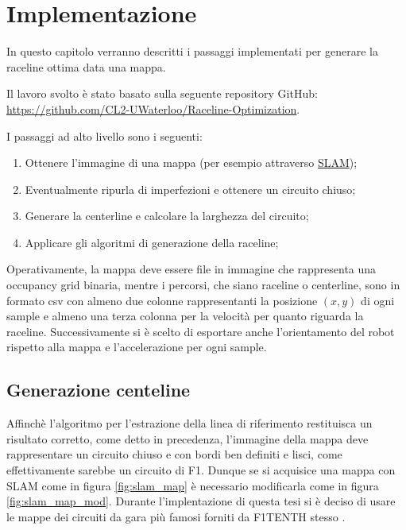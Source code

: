 
\chapter{Implementazione}
In questo capitolo verranno descritti i passaggi implementati per generare la raceline ottima data una
mappa.

Il lavoro svolto è stato basato sulla seguente repository GitHub:
\url{https://github.com/CL2-UWaterloo/Raceline-Optimization}.

\bigskip
\noindent I passaggi ad alto livello sono i seguenti:
\begin{enumerate}
	\item Ottenere l'immagine di una mappa (per esempio attraverso \hyperref[par:slam]{SLAM});
	\item Eventualmente ripurla di imperfezioni e ottenere un circuito chiuso; 
	\item Generare la centerline e calcolare la larghezza del circuito;
	\item Applicare gli algoritmi di generazione della raceline;
\end{enumerate}

Operativamente, la mappa deve essere file in immagine che rappresenta una occupancy grid binaria, mentre
i percorsi, che siano raceline o centerline, sono in formato csv con almeno due colonne rappresentanti la
posizione $(x,y)$ di ogni sample e almeno una terza colonna per la velocità per quanto riguarda la
raceline. Successivamente si è scelto di esportare anche l'orientamento del robot rispetto alla mappa e
l'accelerazione per ogni sample.

\section{Generazione centeline}
Affinchè l'algoritmo per l'estrazione della linea di riferimento restituisca un risultato corretto, come
detto in precedenza, l'immagine della mappa deve rappresentare un circuito chiuso e con bordi ben
definiti e lisci, come effettivamente sarebbe un circuito di F1.
Dunque se si acquisice una mappa con SLAM come in figura \ref{fig:slam_map} è necessario modificarla come
in figura \ref{fig:slam_map_mod}. Durante l'implentazione di questa tesi si è deciso di usare le mappe
dei circuiti da gara più famosi forniti da F1TENTH stesso \cite{f1tenth-gitmaps}.


